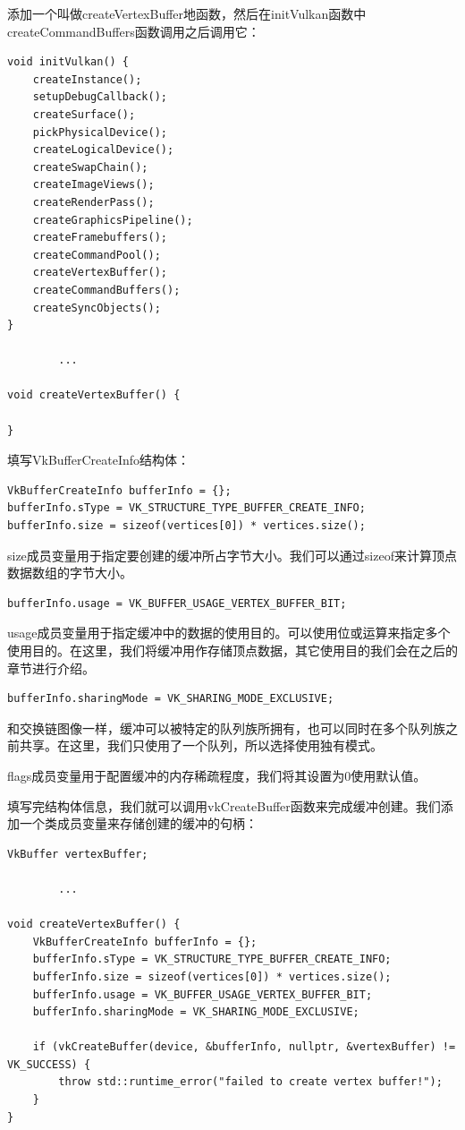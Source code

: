 \documentclass{ctexart}
\begin{document}
添加一个叫做createVertexBuffer地函数，然后在initVulkan函数中createCommandBuffers函数调用之后调用它：

\begin{lstlisting}[language={[ANSI]C}]
void initVulkan() {
	createInstance();
	setupDebugCallback();
	createSurface();
	pickPhysicalDevice();
	createLogicalDevice();
	createSwapChain();
	createImageViews();
	createRenderPass();
	createGraphicsPipeline();
	createFramebuffers();
	createCommandPool();
	createVertexBuffer();
	createCommandBuffers();
	createSyncObjects();
}

		...

void createVertexBuffer() {

}
\end{lstlisting}

填写VkBufferCreateInfo结构体：

\begin{lstlisting}[language={[ANSI]C}]
VkBufferCreateInfo bufferInfo = {};
bufferInfo.sType = VK_STRUCTURE_TYPE_BUFFER_CREATE_INFO;
bufferInfo.size = sizeof(vertices[0]) * vertices.size();
\end{lstlisting}

size成员变量用于指定要创建的缓冲所占字节大小。我们可以通过sizeof来计算顶点数据数组的字节大小。

\begin{lstlisting}[language={[ANSI]C}]
bufferInfo.usage = VK_BUFFER_USAGE_VERTEX_BUFFER_BIT;
\end{lstlisting}

usage成员变量用于指定缓冲中的数据的使用目的。可以使用位或运算来指定多个使用目的。在这里，我们将缓冲用作存储顶点数据，其它使用目的我们会在之后的章节进行介绍。

\begin{lstlisting}[language={[ANSI]C}]
bufferInfo.sharingMode = VK_SHARING_MODE_EXCLUSIVE;
\end{lstlisting}

和交换链图像一样，缓冲可以被特定的队列族所拥有，也可以同时在多个队列族之前共享。在这里，我们只使用了一个队列，所以选择使用独有模式。

flags成员变量用于配置缓冲的内存稀疏程度，我们将其设置为0使用默认值。

填写完结构体信息，我们就可以调用vkCreateBuffer函数来完成缓冲创建。我们添加一个类成员变量来存储创建的缓冲的句柄：

\begin{lstlisting}[language={[ANSI]C}]
VkBuffer vertexBuffer;

		...

void createVertexBuffer() {
	VkBufferCreateInfo bufferInfo = {};
	bufferInfo.sType = VK_STRUCTURE_TYPE_BUFFER_CREATE_INFO;
	bufferInfo.size = sizeof(vertices[0]) * vertices.size();
	bufferInfo.usage = VK_BUFFER_USAGE_VERTEX_BUFFER_BIT;
	bufferInfo.sharingMode = VK_SHARING_MODE_EXCLUSIVE;

	if (vkCreateBuffer(device, &bufferInfo, nullptr, &vertexBuffer) != VK_SUCCESS) {
		throw std::runtime_error("failed to create vertex buffer!");
	}
}
\end{lstlisting}
\end{document}
